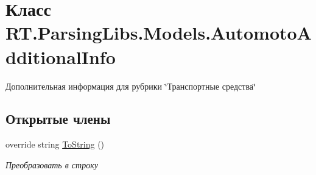 \hypertarget{class_r_t_1_1_parsing_libs_1_1_models_1_1_automoto_additional_info}{\section{Класс R\+T.\+Parsing\+Libs.\+Models.\+Automoto\+Additional\+Info}
\label{class_r_t_1_1_parsing_libs_1_1_models_1_1_automoto_additional_info}
}


Дополнительная информация для рубрики \char`\"{}Транспортные средства\char`\"{}  


\subsection*{Открытые члены}
\begin{DoxyCompactItemize}
\item 
override string \hyperlink{class_r_t_1_1_parsing_libs_1_1_models_1_1_automoto_additional_info_a2cae0df020fa3e2e0d2eb489e869fcb5}{To\+String} ()
\begin{DoxyCompactList}\small\item\em Преобразовать в строку \end{DoxyCompactList}\end{DoxyCompactItemize}
